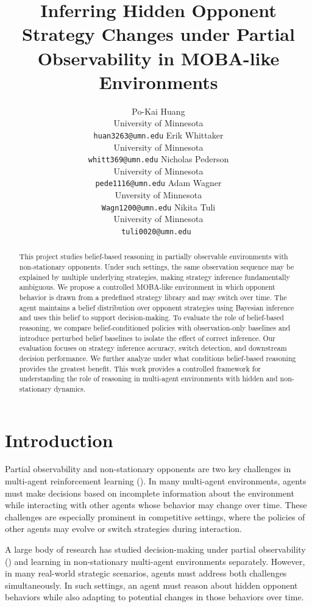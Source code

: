 \documentclass{article}
\title{Inferring Hidden Opponent Strategy Changes under Partial Observability in MOBA-like Environments}
\author{
Po-Kai Huang \\
University of Minnesota \\
\texttt{huan3263@umn.edu}
\And
Erik Whittaker \\
University of Minnesota \\
\texttt{whitt369@umn.edu}
\And
Nicholas Pederson \\
University of Minnesota \\
\texttt{pede1116@umn.edu}
\AND
Adam Wagner \\
Unversity of Minnesota \\
\texttt{Wagn1200@umn.edu}
\And
Nikita Tuli \\
University of Minnesota \\
\texttt{tuli0020@umn.edu }
}
\begin{document}
\maketitle


\begin{abstract}
  This project studies belief-based reasoning in partially observable environments with non-stationary opponents. Under such settings, the same observation sequence may be explained by multiple underlying strategies, making strategy inference fundamentally ambiguous. We propose a controlled MOBA-like environment in which opponent behavior is drawn from a predefined strategy library and may switch over time. The agent maintains a belief distribution over opponent strategies using Bayesian inference and uses this belief to support decision-making. To evaluate the role of belief-based reasoning, we compare belief-conditioned policies with observation-only baselines and introduce perturbed belief baselines to isolate the effect of correct inference. Our evaluation focuses on strategy inference accuracy, switch detection, and downstream decision performance. We further analyze under what conditions belief-based reasoning provides the greatest benefit. This work provides a controlled framework for understanding the role of reasoning in multi-agent environments with hidden and non-stationary dynamics.
\end{abstract}


\section{Introduction}

Partial observability and non-stationary opponents are two key challenges in multi-agent reinforcement learning (\cite{hernandez2017survey, hernandez2019critique, papoudakis2019dealing}). In many multi-agent environments, agents must make decisions based on incomplete information about the environment while interacting with other agents whose behavior may change over time. These challenges are especially prominent in competitive settings, where the policies of other agents may evolve or switch strategies during interaction.

A large body of research has studied decision-making under partial observability (\cite{srinivasan2018acpo}) and learning in non-stationary multi-agent environments separately. However, in many real-world strategic scenarios, agents must address both challenges simultaneously. In such settings, an agent must reason about hidden opponent behaviors while also adapting to potential changes in those behaviors over time.
\end{document}
